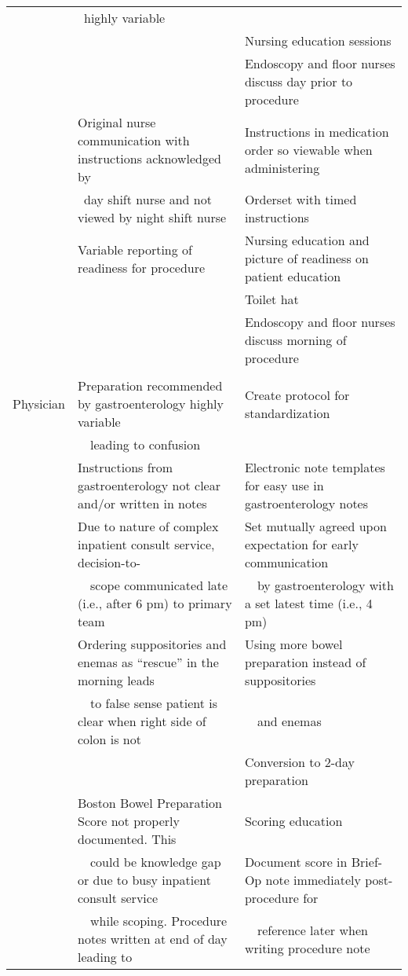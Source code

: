 \begin{flushleft}
\begin{table}
\begin{tiny}
\begin{tabular}{lll}
     & \ highly variable & \\
     & & Nursing education sessions\\
     & & Endoscopy and floor nurses discuss day prior to procedure\\
     & Original nurse communication with instructions acknowledged by & Instructions in medication order so viewable when administering\\ 
     & \ day shift nurse and not viewed by night shift nurse & Orderset with timed instructions \\
     & Variable reporting of readiness for procedure & Nursing education and picture of readiness on patient education\\
     & & Toilet hat\\
     & & Endoscopy and floor nurses discuss morning of procedure\\
     & & \\
    Physician & Preparation recommended by gastroenterology highly variable & Create protocol for standardization \\
     & \ \ leading to confusion & \\
     & Instructions from gastroenterology not clear and/or written in notes & Electronic note templates for easy use in gastroenterology notes\\
     & Due to nature of complex inpatient consult service, decision-to- & Set mutually agreed upon expectation for early communication\\
     & \ \ scope communicated late (i.e., after 6 pm) to primary team & \ \ by gastroenterology with a set latest time (i.e., 4 pm)\\
     & Ordering suppositories and enemas as ``rescue'' in the morning leads & Using more bowel preparation instead of suppositories\\
     & \ \ to false sense patient is clear when right side of colon is not & \ \ and enemas \\
     & & Conversion to 2-day preparation \\
     & Boston Bowel Preparation Score not properly documented. This & Scoring education \\
     & \ \ could be knowledge gap or due to busy inpatient consult service & Document score in Brief-Op note immediately post-procedure for \\
     & \ \ while scoping. Procedure notes written at end of day leading to & \ \ reference later when writing procedure note\\

\end{tabular}
\end{tiny}
\end{table}
\end{flushleft}
